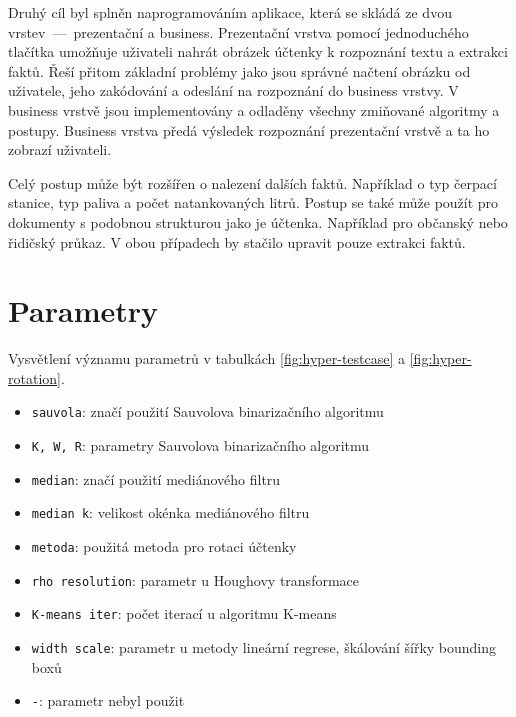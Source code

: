 \documentclass[thesis=B,czech]{FITthesis}[2019/12/23]
\def\myit#1{\texttt{#1}}
\begin{document}
\begin{conclusion}
	Druhý cíl byl splněn naprogramováním aplikace, která se skládá ze dvou vrstev~—~prezentační a business. Prezentační vrstva pomocí jednoduchého tlačítka umožňuje uživateli nahrát obrázek účtenky k rozpoznání textu a extrakci faktů. Řeší přitom základní problémy jako jsou správné načtení obrázku od uživatele, jeho zakódování a odeslání na rozpoznání do business vrstvy. V business vrstvě jsou implementovány a odladěny všechny zmiňované algoritmy a postupy. Business vrstva předá výsledek rozpoznání prezentační vrstvě a ta ho zobrazí uživateli.

	Celý postup může být rozšířen o nalezení dalších faktů. Například o typ čerpací stanice, typ paliva a počet natankovaných litrů. Postup se také může použít pro dokumenty s podobnou strukturou jako je účtenka. Například pro občanský nebo řidičský průkaz. V obou případech by stačilo upravit pouze extrakci faktů.

\end{conclusion}

\setcounter{biburllcpenalty}{7000}
\setcounter{biburlucpenalty}{8000}

\printbibliography
\appendix

\chapter{Parametry}
\label{chapter:params}

Vysvětlení významu parametrů v tabulkách \ref{fig:hyper-testcase} a \ref{fig:hyper-rotation}.

\begin{itemize}
	\item \myit{sauvola}: značí použití Sauvolova binarizačního algoritmu
	\item \myit{K, W, R}: parametry Sauvolova binarizačního algoritmu
	\item \myit{median}: značí použití mediánového filtru
	\item \myit{median k}: velikost okénka mediánového filtru
	\item \myit{metoda}: použitá metoda pro rotaci účtenky
	\item \myit{rho resolution}: parametr u Houghovy transformace
	\item \myit{K-means iter}: počet iterací u algoritmu K-means
	\item \myit{width scale}: parametr u metody lineární regrese, škálování šířky bounding boxů
	\item \myit{-}: parametr nebyl použit
\end{itemize}
\end{document}
